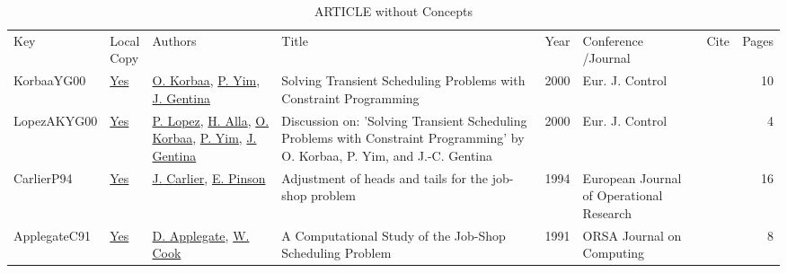 {\scriptsize
\begin{longtable}{llp{5cm}p{10cm}rp{3cm}lr}
\rowcolor{white}\caption{ARTICLE without Concepts}\\ \toprule
\rowcolor{white}Key & \shortstack{Local\\Copy} & Authors & Title & Year & \shortstack{Conference\\/Journal} & Cite & Pages\\ \midrule
\endhead
\bottomrule
\endfoot
KorbaaYG00 & \href{works/KorbaaYG00.pdf}{Yes} & \hyperref[auth:a690]{O. Korbaa}, \hyperref[auth:a691]{P. Yim}, \hyperref[auth:a692]{J. Gentina} & Solving Transient Scheduling Problems with Constraint Programming & 2000 & Eur. J. Control & \cite{KorbaaYG00} & 10\\LopezAKYG00 & \href{works/LopezAKYG00.pdf}{Yes} & \hyperref[auth:a3]{P. Lopez}, \hyperref[auth:a693]{H. Alla}, \hyperref[auth:a690]{O. Korbaa}, \hyperref[auth:a691]{P. Yim}, \hyperref[auth:a692]{J. Gentina} & Discussion on: 'Solving Transient Scheduling Problems with Constraint Programming' by O. Korbaa, P. Yim, and {J.-C.} Gentina & 2000 & Eur. J. Control & \cite{LopezAKYG00} & 4\\CarlierP94 & \href{works/CarlierP94.pdf}{Yes} & \hyperref[auth:a854]{J. Carlier}, \hyperref[auth:a855]{E. Pinson} & Adjustment of heads and tails for the job-shop problem & 1994 & European Journal of Operational Research & \cite{CarlierP94} & 16\\ApplegateC91 & \href{works/ApplegateC91.pdf}{Yes} & \hyperref[auth:a872]{D. Applegate}, \hyperref[auth:a873]{W. Cook} & A Computational Study of the Job-Shop Scheduling Problem & 1991 & ORSA Journal on Computing & \cite{ApplegateC91} & 8\\\end{longtable}
}

